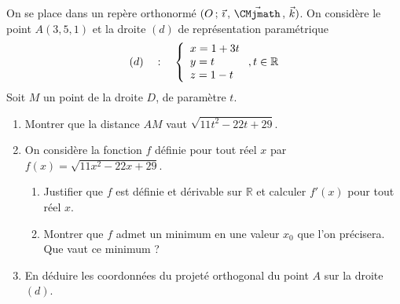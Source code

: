 \documentclass[11pt,fleqn, openany]{book} %
\begin{document}
\begin{exercise}On se place dans un repère orthonormé $\Oijk$. On considère le point $A(3,5,1)$ et la droite $(d)$ de représentation paramétrique
\[(d)\quad : \quad \left\{ \renewcommand{\arraystretch}{1}\renewcommand{\arraystretch}{1}\begin{array}{l}x=1+3t \\ y=t \\ z = 1-t \\\end{array}\right., t \in \mathbb{R}\]
Soit $M$ un point de la droite $D$, de paramètre $t$.
\begin{enumerate}
\item Montrer que la distance $AM$ vaut $\sqrt{11t^2-22t+29}$.
\item On considère la fonction $f$ définie pour tout réel $x$ par $f(x)=\sqrt{11x^2-22x+29}$.
\begin{enumerate}
\item Justifier que $f$ est définie et dérivable sur $\mathbb{R}$ et calculer $f'(x)$ pour tout réel $x$.
\item Montrer que $f$ admet un minimum en une valeur $x_0$ que l'on précisera. Que vaut ce minimum ?
\end{enumerate}
\item En déduire les coordonnées du projeté orthogonal du point $A$ sur la droite $(d)$.
\end{enumerate} \end{exercise}
\end{document}
